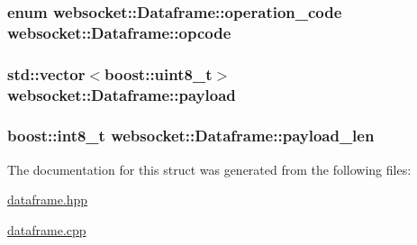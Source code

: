 \subsubsection[{\texorpdfstring{opcode}{opcode}}]{\setlength{\rightskip}{0pt plus 5cm}enum {\bf websocket\+::\+Dataframe\+::operation\+\_\+code}  websocket\+::\+Dataframe\+::opcode}\hypertarget{structwebsocket_1_1Dataframe_a5e3edcbe1a37e58024ec58f9f06dad38}{}\label{structwebsocket_1_1Dataframe_a5e3edcbe1a37e58024ec58f9f06dad38}
\subsubsection[{\texorpdfstring{payload}{payload}}]{\setlength{\rightskip}{0pt plus 5cm}std\+::vector$<$boost\+::uint8\+\_\+t$>$ websocket\+::\+Dataframe\+::payload}\hypertarget{structwebsocket_1_1Dataframe_a809c2f387810fa2accd6602a290a6876}{}\label{structwebsocket_1_1Dataframe_a809c2f387810fa2accd6602a290a6876}
\subsubsection[{\texorpdfstring{payload\+\_\+len}{payload_len}}]{\setlength{\rightskip}{0pt plus 5cm}boost\+::int8\+\_\+t websocket\+::\+Dataframe\+::payload\+\_\+len}\hypertarget{structwebsocket_1_1Dataframe_ae8d89a8c10d3b372c09d65364613c716}{}\label{structwebsocket_1_1Dataframe_ae8d89a8c10d3b372c09d65364613c716}


The documentation for this struct was generated from the following files\+:\begin{DoxyCompactItemize}
\item 
\hyperlink{dataframe_8hpp}{dataframe.\+hpp}\item 
\hyperlink{dataframe_8cpp}{dataframe.\+cpp}\end{DoxyCompactItemize}
